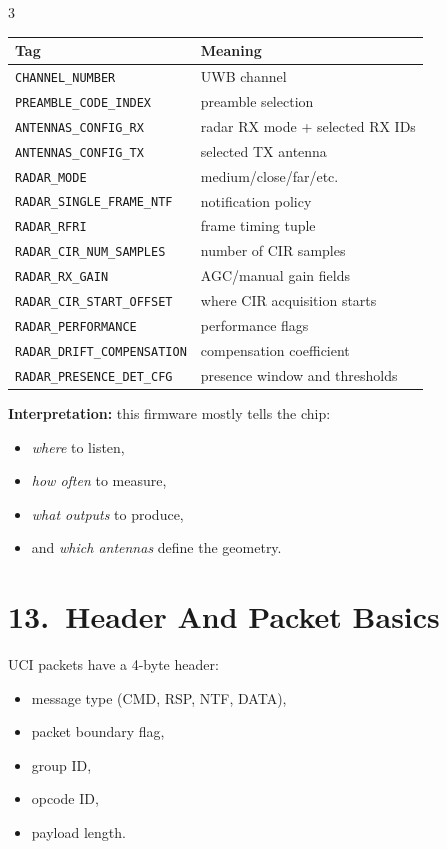 \documentclass[10pt]{article}
\begin{document}
\begin{multicols*}{3}
\begin{tabular}{@{}p{2.2cm}p{5.0cm}@{}}
\toprule
Tag & Meaning \\
\midrule
\texttt{CHANNEL\_NUMBER} & UWB channel \\
\texttt{PREAMBLE\_CODE\_INDEX} & preamble selection \\
\texttt{ANTENNAS\_CONFIG\_RX} & radar RX mode + selected RX IDs \\
\texttt{ANTENNAS\_CONFIG\_TX} & selected TX antenna \\
\texttt{RADAR\_MODE} & medium/close/far/etc. \\
\texttt{RADAR\_SINGLE\_FRAME\_NTF} & notification policy \\
\texttt{RADAR\_RFRI} & frame timing tuple \\
\texttt{RADAR\_CIR\_NUM\_SAMPLES} & number of CIR samples \\
\texttt{RADAR\_RX\_GAIN} & AGC/manual gain fields \\
\texttt{RADAR\_CIR\_START\_OFFSET} & where CIR acquisition starts \\
\texttt{RADAR\_PERFORMANCE} & performance flags \\
\texttt{RADAR\_DRIFT\_COMPENSATION} & compensation coefficient \\
\texttt{RADAR\_PRESENCE\_DET\_CFG} & presence window and thresholds \\
\bottomrule
\end{tabular}

\textbf{Interpretation:}
this firmware mostly tells the chip:
\begin{itemize}
  \item \emph{where} to listen,
  \item \emph{how often} to measure,
  \item \emph{what outputs} to produce,
  \item and \emph{which antennas} define the geometry.
\end{itemize}

\section*{13.\ Header And Packet Basics}

UCI packets have a 4-byte header:
\begin{itemize}
  \item message type (CMD, RSP, NTF, DATA),
  \item packet boundary flag,
  \item group ID,
  \item opcode ID,
  \item payload length.
\end{itemize}


\end{multicols*}
\end{document}
